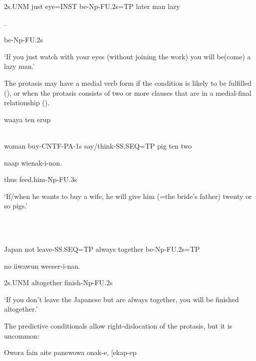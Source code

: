 2s.UNM  just  eye=INST  be-Np-FU.2s=TP  later  man  lazy

\textstyleEmphasizedVernacularWords{-}\textstyleEmphasizedVernacularWords{-}.

be-Np-FU.2s

`If you just watch with your eyes (without joining the work) you will be(come) a lazy man.'

The protasis may have a medial verb form if the condition is likely to be fulfilled (), or when the protasis consists of two or more clauses that are in a medial-final relationship ().

\ea%
\label{ex:x1654}
\gll [Emeria  \textstyleEmphasizedVernacularWords{sesenar}\textstyleEmphasizedVernacularWords{-}\textstyleEmphasizedVernacularWords{ek}\textstyleEmphasizedVernacularWords{-}\textstyleEmphasizedVernacularWords{a}\textstyleEmphasizedVernacularWords{-m  na-ep=na}]  waaya  ten  erup \\
      \\
\glt
\z

woman  buy-CNTF-PA-1s  say/think-SS.SEQ=TP  pig  ten  two

naap  wienak-i-non.

thus  feed.him-Np-FU.3s

`If/when he wants to buy a wife, he will give him (=the bride's father) twenty or so pigs.'

\ea%
\label{ex:x1653}
\gll [Yaapan  me  \textstyleEmphasizedVernacularWords{piipu-ap=na}  anane  epaskun  ika-i-nan=na] \\
      \\
\glt
\z

Japan  not  leave-SS.SEQ=TP  always  together  be-Np-FU.2s=TP

no  iiwawun  weeser-i-nan.

2s.UNM  altogether  finish-Np-FU.2s

`If you don't leave the Japanese but are always together, you will be finished altogether.'

The predictive conditionals allow right-dislocation of the protasis, but it is uncommon: 

\ea%
\label{ex:x1662}
\gll Owora  fain  aite  panewowa  onak-e,  [ekap-ep  \\
      \\
\glt
\z

